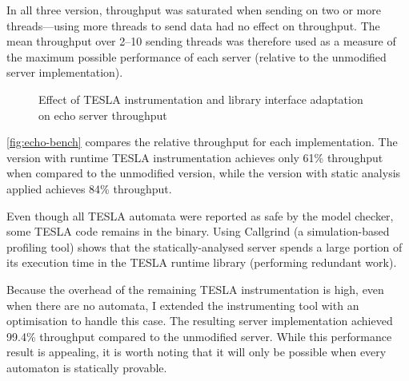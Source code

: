In all three version, throughput was saturated when sending on two or more
threads---using more threads to send data had no effect on throughput. The mean
throughput over 2--10 sending threads was therefore used as a measure of the
maximum possible performance of each server (relative to the unmodified server
implementation). 

\begin{figure}
  \centering
  \caption{Effect of TESLA instrumentation and library interface adaptation on
  echo server throughput}
  \label{fig:echo-bench}
\end{figure}

\autoref{fig:echo-bench} compares the relative throughput for each
implementation. The version with runtime TESLA instrumentation achieves only 61\%
throughput when compared to the unmodified version, while the version with
static analysis applied achieves 84\% throughput.

Even though all TESLA automata were reported as safe by the model checker, some
TESLA code remains in the binary. Using Callgrind \cite{weidendorfer_tool_2004}
(a simulation-based profiling tool) shows that the statically-analysed server
spends a large portion of its execution time in the TESLA runtime library
(performing redundant work).

Because the overhead of the remaining TESLA instrumentation is high, even when
there are no automata, I extended the instrumenting tool with an optimisation to
handle this case. The resulting server implementation achieved 99.4\% throughput
compared to the unmodified server. While this performance result is appealing,
it is worth noting that it will only be possible when every automaton is
statically provable.

